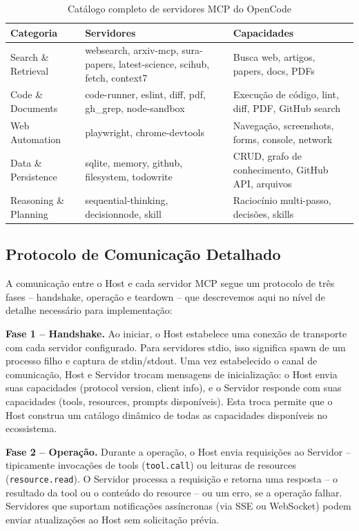 \documentclass[12pt,a4paper,sumario=tradicional,openany]{abntex2}
\begin{document}
\begin{table}[H]
\centering
\small
\caption{Catálogo completo de servidores MCP do OpenCode}
\label{tab:mcp-catalog}
\begin{tabular}{@{}p{2.5cm}p{5.5cm}p{5cm}@{}}
\toprule
\textbf{Categoria} & \textbf{Servidores} & \textbf{Capacidades} \\
\midrule
Search \& Retrieval & websearch, arxiv-mcp, sura-papers, latest-science, scihub, fetch, context7 & Busca web, artigos, papers, docs, PDFs \\
\midrule
Code \& Documents & code-runner, eslint, diff, pdf, gh\_grep, node-sandbox & Execução de código, lint, diff, PDF, GitHub search \\
\midrule
Web Automation & playwright, chrome-devtools & Navegação, screenshots, forms, console, network \\
\midrule
Data \& Persistence & sqlite, memory, github, filesystem, todowrite & CRUD, grafo de conhecimento, GitHub API, arquivos \\
\midrule
Reasoning \& Planning & sequential-thinking, decisionnode, skill & Raciocínio multi-passo, decisões, skills \\
\bottomrule
\end{tabular}
\end{table}

\subsection{Protocolo de Comunicação Detalhado}

A comunicação entre o Host e cada servidor MCP segue um protocolo de três fases -- handshake, operação e teardown -- que descrevemos aqui no nível de detalhe necessário para implementação:

\textbf{Fase 1 -- Handshake.} Ao iniciar, o Host estabelece uma conexão de transporte com cada servidor configurado. Para servidores stdio, isso significa spawn de um processo filho e captura de stdin/stdout. Uma vez estabelecido o canal de comunicação, Host e Servidor trocam mensagens de inicialização: o Host envia suas capacidades (protocol version, client info), e o Servidor responde com suas capacidades (tools, resources, prompts disponíveis). Esta troca permite que o Host construa um catálogo dinâmico de todas as capacidades disponíveis no ecossistema.

\textbf{Fase 2 -- Operação.} Durante a operação, o Host envia requisições ao Servidor -- tipicamente invocações de tools (\texttt{tool.call}) ou leituras de resources (\texttt{resource.read}). O Servidor processa a requisição e retorna uma resposta -- o resultado da tool ou o conteúdo do resource -- ou um erro, se a operação falhar. Servidores que suportam notificações assíncronas (via SSE ou WebSocket) podem enviar atualizações ao Host sem solicitação prévia.
\end{document}
